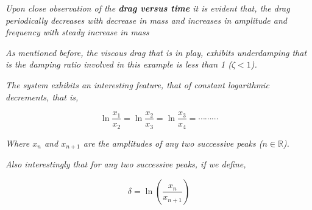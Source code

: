 \textit{Upon close observation of the \textbf{drag versus time} it is evident that, the drag periodically decreases with decrease in mass and increases in amplitude and frequency with steady increase in mass}

\textit{As mentioned before, the viscous drag that is in play, exhibits underdamping that is the damping ratio involved in this example is less than 1 ($\zeta < 1$).}

\textit{The system exhibits an interesting feature, that of constant logarithmic decrements, that is,}
        
    $$\ln{\frac{x_1}{x_2}} = \ln{\frac{x_2}{x_3}} = \ln{\frac{x_3}{x_4}} = \cdots\cdots\cdots$$
        
\textit{Where $x_n$ and $x_{n + 1}$ are the amplitudes of any two successive peaks ($n \in \mathbb{R}$).}
        
\textit{Also interestingly that for any two successive peaks, if we define,}
        
    $$\delta = \ln{\left(\frac{x_n}{x_{n + 1}}\right)}$$
        


